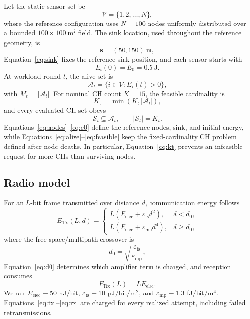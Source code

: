 \documentclass[pdflatex,sn-mathphys-num]{sn-jnl}
\begin{document}
Let the static sensor set be
\begin{equation}
\mathcal{V}=\{1,2,\ldots,N\},
\label{eq:nodes}
\end{equation}
where the reference configuration uses $N=100$ nodes uniformly distributed over a bounded $100\times100~\mathrm{m}^2$ field. The sink location, used throughout the reference geometry, is
\begin{equation}
\mathbf{s}=(50,150)\ \mathrm{m},
\label{eq:sink}
\end{equation}
Equation~\eqref{eq:sink} fixes the reference sink position, and each sensor starts with
\begin{equation}
E_i(0)=E_0=0.5\ \mathrm{J}.
\label{eq:e0}
\end{equation}
At workload round $t$, the alive set is
\begin{equation}
\mathcal{A}_t=\{i\in\mathcal{V}:E_i(t)>0\},
\label{eq:alive}
\end{equation}
with $M_t=|\mathcal{A}_t|$. For nominal CH count $K=15$, the feasible cardinality is
\begin{equation}
K_t=\min(K,|\mathcal{A}_t|),
\label{eq:kt}
\end{equation}
and every evaluated CH set obeys
\begin{equation}
\mathcal{S}_t\subseteq\mathcal{A}_t,\qquad |\mathcal{S}_t|=K_t.
\label{eq:feasible}
\end{equation}
Equations~\eqref{eq:nodes}--\eqref{eq:e0} define the reference nodes, sink, and initial energy, while Equations~\eqref{eq:alive}--\eqref{eq:feasible} keep the fixed-cardinality CH problem defined after node deaths. In particular, Equation~\eqref{eq:kt} prevents an infeasible request for more CHs than surviving nodes.

\subsection{Radio model}

For an $L$-bit frame transmitted over distance $d$, communication energy follows
\begin{equation}
E_{\mathrm{Tx}}(L,d)=
\begin{cases}
L(E_{\mathrm{elec}}+\varepsilon_{\mathrm{fs}}d^2), & d<d_0,\\
L(E_{\mathrm{elec}}+\varepsilon_{\mathrm{mp}}d^4), & d\ge d_0,
\end{cases}
\label{eq:tx}
\end{equation}
where the free-space/multipath crossover is
\begin{equation}
d_0=\sqrt{\frac{\varepsilon_{\mathrm{fs}}}{\varepsilon_{\mathrm{mp}}}},
\label{eq:d0}
\end{equation}
Equation~\eqref{eq:d0} determines which amplifier term is charged, and reception consumes
\begin{equation}
E_{\mathrm{Rx}}(L)=L E_{\mathrm{elec}}.
\label{eq:rx}
\end{equation}
We use $E_{\mathrm{elec}}=50$ nJ/bit, $\varepsilon_{\mathrm{fs}}=10$ pJ/bit/m$^2$, and $\varepsilon_{\mathrm{mp}}=1.3$ fJ/bit/m$^4$. Equations~\eqref{eq:tx}--\eqref{eq:rx} are charged for every realized attempt, including failed retransmissions.
\end{document}
